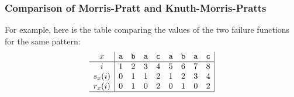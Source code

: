 %
\begin{frame}
\frametitle{Comparison of Morris-Pratt and Knuth-Morris-Pratts}

For example, here is the table comparing the values of the two failure
functions for the same pattern:
\[
\begin{array}{c|cccccccc|}
 x & \texttt{a} & \texttt{b} & \texttt{a} & \texttt{c} 
 & \texttt{a} & \texttt{b} & \texttt{a} & \texttt{c}\\
\hline
  i
& 1 & 2 & 3 & 4 & 5 & 6 & 7 & 8\\
  s_{x}(i)
& 0 & 1 & 1 & 2 & 1 & 2 & 3 & 4\\
  r_{x}(i)
& 0 & 1 & 0 & 2 & 0 & 1 & 0 & 2\\
\hline
\end{array}
\]

\end{frame}
